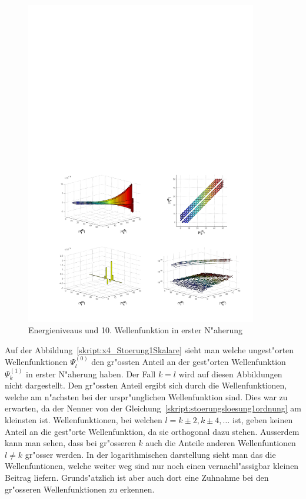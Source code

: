 \begin{refsection}
\begin{figure}[h]	%
\centering
\includegraphics[width=0.9\textwidth]{anharmonisch/images/x4/Stoerung2Skalare.pdf}
\caption{Energieniveaus und 10. Wellenfunktion in erster N"aherung
\label{skript:x4_Stoerung2Skalare}}
\end{figure}

Auf der Abbildung~\ref{skript:x4_Stoerung1Skalare} sieht man welche ungest"orten Wellenfunktionen $\Psi_l^{(0)}$ den gr"ossten Anteil an der gest"orten Wellenfunktion $\Psi_k^{(1)}$ in erster N"aherung haben. Der Fall $k=l$ wird auf diesen Abbildungen nicht dargestellt. Den gr"ossten Anteil ergibt sich durch die Wellenfunktionen, welche am n"achsten bei der urspr"unglichen Wellenfunktion sind. Dies war zu erwarten, da der Nenner von der Gleichung~\ref{skript:stoerungsloesung1ordnung} am kleinsten ist. Wellenfunktionen, bei welchen $l=k\pm 2,k\pm 4,\dots$ ist, geben keinen Anteil an die gest"orte Wellenfunktion, da sie orthogonal dazu stehen. Ausserdem kann man sehen, dass bei gr"osseren $k$ auch die Anteile anderen Wellenfuntionen $l\neq k$ gr"osser werden. In der logarithmischen darstellung sieht man das die Wellenfuntionen, welche weiter weg sind nur noch einen vernachl"assigbar kleinen Beitrag liefern. Grunds"atzlich ist aber auch dort eine Zuhnahme bei den gr"osseren Wellenfunktionen zu erkennen.

\printbibliography[heading=subbibliography]
\end{refsection}

